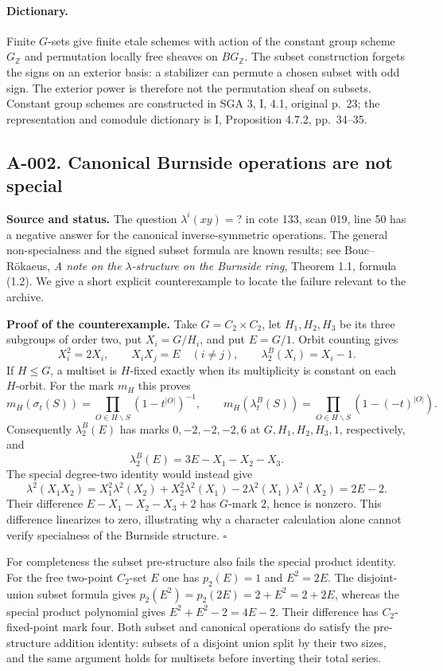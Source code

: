\paragraph{Dictionary.}
Finite $G$-sets give finite etale schemes with action of the constant group
scheme $G_{\mathbb Z}$ and permutation locally free sheaves on
$BG_{\mathbb Z}$.  The subset construction forgets the signs on an exterior
basis: a stabilizer can permute a chosen subset with odd sign.  The exterior
power is therefore not the permutation sheaf on subsets.  Constant group
schemes are constructed in SGA 3, I, 4.1, original p.~23; the representation
and comodule dictionary is I, Proposition 4.7.2, pp.~34--35.

\subsection*{A-002. Canonical Burnside operations are not special}
\textbf{Source and status.} The question $\lambda^i(xy)=?$ in cote 133,
scan 019, line 50 has a negative answer for the canonical inverse-symmetric
operations.  The general non-specialness and the signed subset formula are
known results; see Bouc--R\"okaeus, \emph{A note on the $\lambda$-structure on
the Burnside ring}, Theorem 1.1, formula (1.2).  We give a short explicit
counterexample to locate the failure relevant to the archive.

\textbf{Proof of the counterexample.}
Take $G=C_2\times C_2$, let $H_1,H_2,H_3$ be its three subgroups of order
two, put $X_i=G/H_i$, and put $E=G/1$.  Orbit counting gives
\[
 X_i^2=2X_i,\qquad X_iX_j=E\quad(i\ne j),\qquad
 \lambda_2^B(X_i)=X_i-1.
\]
If $H\leq G$, a multiset is $H$-fixed exactly when its multiplicity is
constant on each $H$-orbit.  For the mark $m_H$ this proves
\[
 m_H(\sigma_t(S))=\prod_{O\in H\backslash S}(1-t^{|O|})^{-1},\qquad
 m_H(\lambda_t^B(S))=\prod_{O\in H\backslash S}(1-(-t)^{|O|}).
\]
Consequently $\lambda_2^B(E)$ has marks $0,-2,-2,-2,6$ at
$G,H_1,H_2,H_3,1$, respectively, and
\[
 \lambda_2^B(E)=3E-X_1-X_2-X_3.
\]
The special degree-two identity would instead give
\[
 \lambda^2(X_1X_2)
 =X_1^2\lambda^2(X_2)+X_2^2\lambda^2(X_1)
       -2\lambda^2(X_1)\lambda^2(X_2)=2E-2.
\]
Their difference $E-X_1-X_2-X_3+2$ has $G$-mark $2$, hence is nonzero.
This difference linearizes to zero, illustrating why a character calculation
alone cannot verify specialness of the Burnside structure. \hfill$\square$

For completeness the subset pre-structure also fails the special
product identity. For the free two-point $C_2$-set $E$ one has
$p_2(E)=1$ and $E^2=2E$. The disjoint-union subset formula gives
$p_2(E^2)=p_2(2E)=2+E^2=2+2E$, whereas the special product
polynomial gives $E^2+E^2-2=4E-2$. Their difference has
$C_2$-fixed-point mark four. Both subset and canonical operations
do satisfy the pre-structure addition identity: subsets of a
disjoint union split by their two sizes, and the same argument
holds for multisets before inverting their total series.

